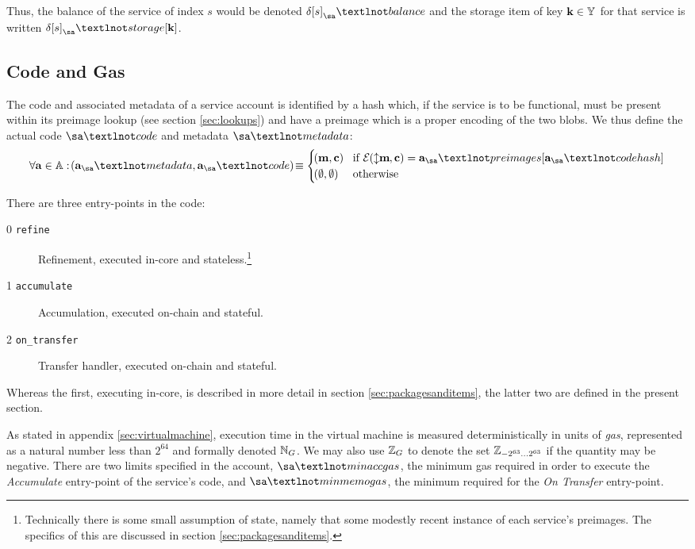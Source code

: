 Thus, the balance of the service of index $s$ would be denoted $\accounts\subb{s}_\sa¬balance$ and the storage item of key $\mathbf{k} \in \mathbb{Y}_{}$ for that service is written $\accounts\subb{s}_\sa¬storage\subb{\mathbf{k}}$.








\subsection{Code and Gas}

The code and associated metadata of a service account is identified by a hash which, if the service is to be functional, must be present within its preimage lookup (see section \ref{sec:lookups}) and have a preimage which is a proper encoding of the two blobs. We thus define the actual code $\sa¬code$ and metadata $\sa¬metadata$:
\begin{align}
  \forall \mathbf{a} \in \serviceaccount : \tup{\mathbf{a}_\sa¬metadata, \mathbf{a}_\sa¬code} \equiv \begin{cases}
    \tup{\mathbf{m}, \mathbf{c}} &\when \encode{\var{\mathbf{m}}, \mathbf{c}} = \mathbf{a}_\sa¬preimages[\mathbf{a}_\sa¬codehash] \\
    \tup{\none, \none} &\otherwise
  \end{cases}
\end{align}

There are three entry-points in the code:
\begin{description}
  \item[0 \texttt{refine}]Refinement, executed in-core and stateless.\footnote{Technically there is some small assumption of state, namely that some modestly recent instance of each service's preimages. The specifics of this are discussed in section \ref{sec:packagesanditems}.}
  \item[1 \texttt{accumulate}] Accumulation, executed on-chain and stateful.
  \item[2 \texttt{on\_transfer}] Transfer handler, executed on-chain and stateful.
\end{description}

Whereas the first, executing in-core, is described in more detail in section \ref{sec:packagesanditems}, the latter two are defined in the present section.

As stated in appendix \ref{sec:virtualmachine}, execution time in the \Jam virtual machine is measured deterministically in units of \emph{gas}, represented as a natural number less than $2^{64}$ and formally denoted $\mathbb{N}_G$. We may also use $\mathbb{Z}_G$ to denote the set $\mathbb{Z}_{-2^{63}\dots2^{63}}$ if the quantity may be negative. There are two limits specified in the account, $\sa¬minaccgas$, the minimum gas required in order to execute the \emph{Accumulate} entry-point of the service's code, and $\sa¬minmemogas$, the minimum required for the \emph{On Transfer} entry-point.










